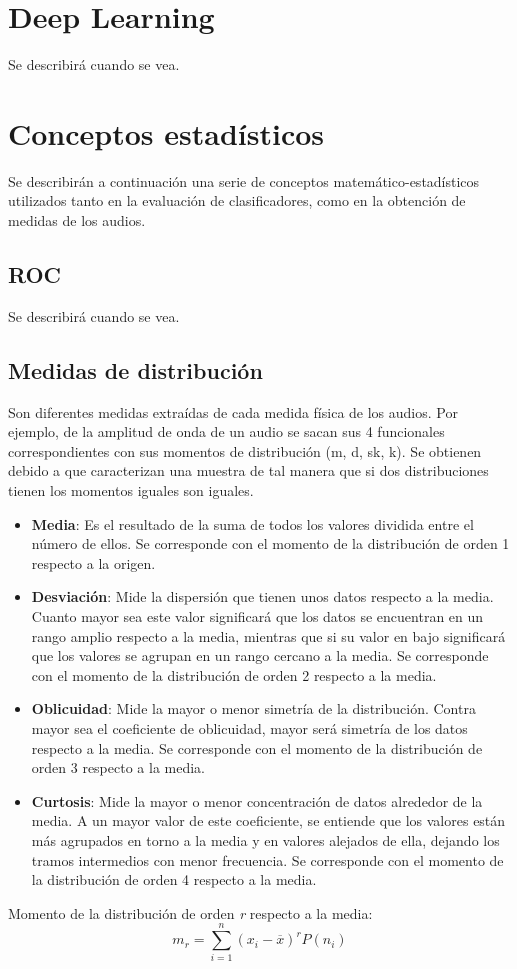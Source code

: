 \section{Deep Learning}
Se describirá cuando se vea.

\section{Conceptos estadísticos}
Se describirán a continuación una serie de conceptos matemático-estadísticos utilizados tanto en la evaluación de clasificadores, como en la obtención de medidas de los audios.
\subsection{ROC}
Se describirá cuando se vea.

\subsection{Medidas de distribución}
Son diferentes medidas extraídas de cada medida física de los audios. Por ejemplo, de la amplitud de onda de un audio se sacan sus 4 funcionales correspondientes con sus momentos de distribución (m, d, sk, k). Se obtienen debido a que caracterizan una muestra de tal manera que si dos distribuciones tienen los momentos iguales son iguales.
\begin{itemize}
	\item \textbf{Media}: Es el resultado de la suma de todos los valores dividida entre el número de ellos. Se corresponde con el momento de la distribución de orden 1 respecto a la origen. 
	\item \textbf{Desviación}: Mide la dispersión que tienen unos datos respecto a la media. Cuanto mayor sea este valor significará que los datos se encuentran en un rango amplio respecto a la media, mientras que si su valor en bajo significará que los valores se agrupan en un rango cercano a la media. Se corresponde con el momento de la distribución de orden 2 respecto a la media. 
	\item \textbf{Oblicuidad}: Mide la mayor o menor simetría de la distribución. Contra mayor sea el coeficiente de oblicuidad, mayor será simetría de los datos respecto a la media. Se corresponde con el momento de la distribución de orden 3 respecto a la media. 
	\item \textbf{Curtosis}: Mide la mayor o menor concentración de datos alrededor de la media. A un mayor valor de este coeficiente, se entiende que los valores están más agrupados en torno a la media y en valores alejados de ella, dejando los tramos intermedios con menor frecuencia. Se corresponde con el momento de la distribución de orden 4 respecto a la media. 
\end{itemize}
Momento de la distribución de orden \textit{r} respecto a la media:\\
\begin{equation}
m_{r} = \sum_{i=1}^{n} (x_{i} - \overline{x})^{r} P(n_{i})
\end{equation}

